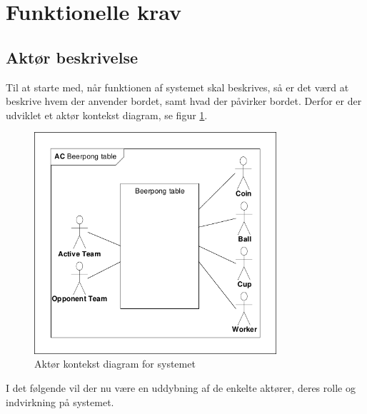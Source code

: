 \documentclass[Kravspecifikation/Kravspec_Main.tex]{subfiles}
\begin{document}
\section{Funktionelle krav}\label{sec:funktionelle_krav}

\subsection{Aktør beskrivelse}\label{sec:actor_description}
Til at starte med, når funktionen af systemet skal beskrives, så er det værd at beskrive hvem der anvender bordet, samt hvad der påvirker bordet. Derfor er der udviklet et aktør kontekst diagram, se figur \ref{fig:Actor-context}.
\begin{figure}[H]
    \centering
    \includegraphics[width=0.8\textwidth,trim={0.24in 0.24in 0.24in 0.24in},clip, page=1]{Kravspecifikation/Funktionelle_krav/graphics_funktionel/Krav-spec-diagrammer.pdf}
    \caption{Aktør kontekst diagram for systemet}
    \label{fig:Actor-context}
\end{figure}
I det følgende vil der nu være en uddybning af de enkelte aktører, deres rolle og indvirkning på systemet.
\end{document}
